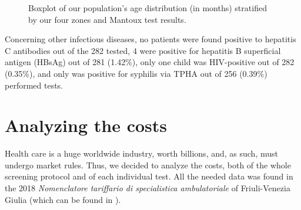 \begin{figure}[H]
\caption{Boxplot of our population's age distribution (in months) stratified by our four zones and Mantoux test results.}
\label{fig:boxplot_Mantoux}
\end{figure}

Concerning other infectious diseases, no patients were found positive to hepatitis C antibodies out of the 282 tested, 4 were positive for hepatitis B superficial antigen (HBsAg) out of 281 (1.42\%), only one child was HIV-positive out of 282 (0.35\%), and only was positive for syphilis via TPHA out of 256 (0.39\%) performed tests.

\section{Analyzing the costs}\label{sec:analyzingcosts}
Health care is a huge worldwide industry, worth billions, and, as such, must undergo market rules. Thus, we decided to analyze the costs, both of the whole screening protocol and of each individual test. All the needed data was found in the 2018 \textit{Nomenclatore tariffario di specialistica ambulatoriale} of Friuli-Venezia Giulia (which can be found in \cite{nomenclatore}).

